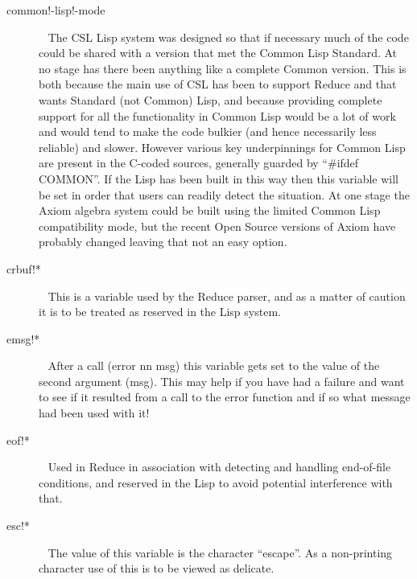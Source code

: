 \documentclass[a4paper,11pt]{article}
\begin{document}
\begin{description}
\item [{\ttfamily common!-lisp!-mode}]  ~\newline
The CSL Lisp system was designed so that if necessary much of the code could
be shared with a version that met the Common Lisp Standard. At no stage has
there been anything like a complete Common version. This is both because the
main use of CSL has been to support Reduce and that wants Standard (not
Common) Lisp, and because providing complete support for all the
functionality in Common Lisp would be a lot of work and would tend to make
the code bulkier (and hence necessarily less reliable) and slower. However
various key underpinnings for Common Lisp are present in the C-coded sources,
generally guarded by ``{\ttfamily \#ifdef COMMON}''. If the Lisp has been
built in this way then this variable will be set in order that users can
readily detect the situation.  At one stage the Axiom algebra system could
be built using the limited Common Lisp compatibility mode, but the recent
Open Source versions of Axiom have probably changed leaving that not an
easy option.

\item [{\ttfamily crbuf!*}]  ~\newline
This is a variable used by the Reduce parser, and as a matter of caution it
is to be treated as reserved in the Lisp system.

\item [{\ttfamily emsg!*}]  ~\newline
After a call {\ttfamily (error nn msg)} this variable gets set to the
value of the second argument ({\ttfamily msg}). This may help if you have had
a failure and want to see if it resulted from a call to the {\ttfamily error}
function and if so what message had been used with it!

\item [{\ttfamily eof!*}]  ~\newline
Used in Reduce in association with detecting and handling end-of-file
conditions, and reserved in the Lisp to avoid potential interference with
that.

\item [{\ttfamily esc!*}]  ~\newline
The value of this variable is the character ``escape''. As a non-printing
character use of this is to be viewed as delicate.


\end{description}
\end{document}
